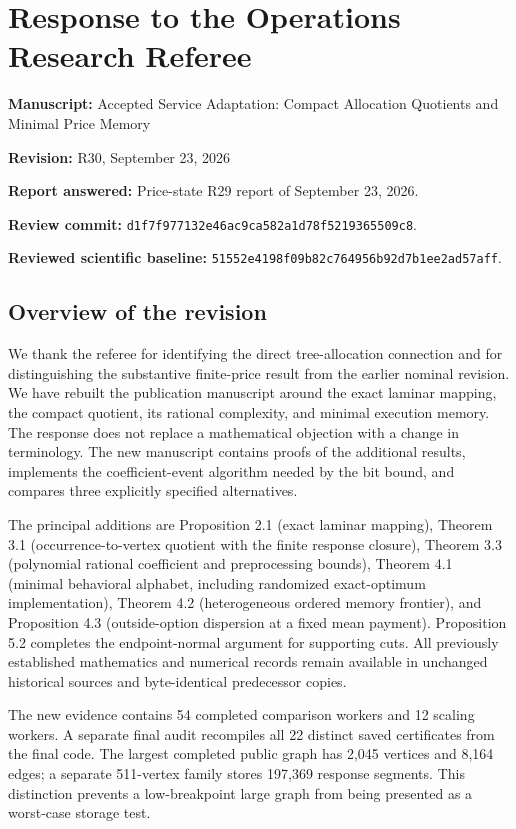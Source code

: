 \documentclass[
  11pt,
]{article}
\author{}
\date{}
\begin{document}
\section{Response to the Operations Research
Referee}\label{response-to-the-operations-research-referee}

\textbf{Manuscript:} Accepted Service Adaptation: Compact Allocation
Quotients and Minimal Price Memory

\textbf{Revision:} R30, September 23, 2026

\textbf{Report answered:} Price-state R29 report of September 23, 2026.

\textbf{Review commit:}
\texttt{d1f7f977132e46ac9ca582a1d78f5219365509c8}.

\textbf{Reviewed scientific baseline:}
\texttt{51552e4198f09b82c764956b92d7b1ee2ad57aff}.

\subsection{Overview of the revision}\label{overview-of-the-revision}

We thank the referee for identifying the direct tree-allocation
connection and for distinguishing the substantive finite-price result
from the earlier nominal revision. We have rebuilt the publication
manuscript around the exact laminar mapping, the compact quotient, its
rational complexity, and minimal execution memory. The response does not
replace a mathematical objection with a change in terminology. The new
manuscript contains proofs of the additional results, implements the
coefficient-event algorithm needed by the bit bound, and compares three
explicitly specified alternatives.

The principal additions are Proposition 2.1 (exact laminar mapping),
Theorem 3.1 (occurrence-to-vertex quotient with the finite response
closure), Theorem 3.3 (polynomial rational coefficient and preprocessing
bounds), Theorem 4.1 (minimal behavioral alphabet, including randomized
exact-optimum implementation), Theorem 4.2 (heterogeneous ordered memory
frontier), and Proposition 4.3 (outside-option dispersion at a fixed
mean payment). Proposition 5.2 completes the endpoint-normal argument
for supporting cuts. All previously established mathematics and
numerical records remain available in unchanged historical sources and
byte-identical predecessor copies.

The new evidence contains 54 completed comparison workers and 12 scaling
workers. A separate final audit recompiles all 22 distinct saved
certificates from the final code. The largest completed public graph has
2,045 vertices and 8,164 edges; a separate 511-vertex family stores
197,369 response segments. This distinction prevents a low-breakpoint
large graph from being presented as a worst-case storage test.
\end{document}
